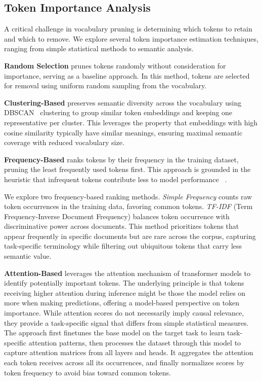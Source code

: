 \documentclass[twocolumn]{article}
\begin{document}

\subsection{Token Importance Analysis}
A critical challenge in vocabulary pruning is determining which tokens to retain and which to remove.
We explore several token importance estimation techniques, ranging from simple statistical methods to semantic analysis.

\textbf{Random Selection}
prunes tokens randomly without consideration for importance, serving as a baseline approach. In this method, tokens are selected for removal using uniform random sampling from the vocabulary.

\textbf{Clustering-Based}
preserves semantic diversity across the vocabulary using DBSCAN~\cite{wang2019dbscan} clustering to group similar token embeddings and keeping one representative per cluster. This leverages the property that embeddings with high cosine similarity typically have similar meanings\cite{mikolov2013efficient}, ensuring maximal semantic coverage with reduced vocabulary size.

\textbf{Frequency-Based} ranks tokens by their frequency in the training dataset, pruning the least frequently used tokens first. This approach is grounded in the heuristic that infrequent tokens contribute less to model performance ~\cite {li2024enhancing}.

We explore two frequency-based ranking methods. 
\textit{Simple Frequency} counts raw token occurrences in the training data, favoring common tokens.
\textit{TF-IDF} (Term Frequency-Inverse Document Frequency) balances token occurrence with discriminative power across documents. This method prioritizes tokens that appear frequently in specific documents but are rare across the corpus, capturing task-specific terminology while filtering out ubiquitous tokens that carry less semantic value. 

\textbf{Attention-Based}
leverages the attention mechanism of transformer models to identify potentially important tokens. The underlying principle is that tokens receiving higher attention during inference might be those the model relies on more when making predictions, offering a model-based perspective on token importance\cite{guo2024attention, kim2022learned, goyal2020powerbert, chen2021earlybert}. While attention scores do not necessarily imply causal relevance, they provide a task-specific signal that differs from simple statistical measures. The approach first finetunes the base model on the target task to learn task-specific attention patterns, then processes the dataset through this model to capture attention matrices from all layers and heads. It aggregates the attention each token receives across all its occurrences, and finally normalizes scores by token frequency to avoid bias toward common tokens.
\end{document}

